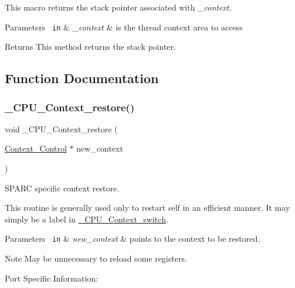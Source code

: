 This macro returns the stack pointer associated with {\itshape \+\_\+context}.


\begin{DoxyParams}[1]{Parameters}
\mbox{\texttt{ in}}  & {\em \+\_\+context} & is the thread context area to access\\
\hline
\end{DoxyParams}
\begin{DoxyReturn}{Returns}
This method returns the stack pointer. 
\end{DoxyReturn}


\subsection{Function Documentation}
\mbox{\label{group__RTEMSScoreCPUV850CPUContext_ga80726ebfe00f31a88b086cc4474c472f}} 
\subsubsection{\texorpdfstring{\_CPU\_Context\_restore()}{\_CPU\_Context\_restore()}}
{\footnotesize\ttfamily void \+\_\+\+C\+P\+U\+\_\+\+Context\+\_\+restore (\begin{DoxyParamCaption}\item[{\mbox{\hyperlink{structContext__Control}{Context\+\_\+\+Control}} $\ast$}]{new\+\_\+context }\end{DoxyParamCaption})}



S\+P\+A\+RC specific context restore. 

This routine is generally used only to restart self in an efficient manner. It may simply be a label in \mbox{\hyperlink{group__RTEMSScoreCPUARM_gaa9f8cc989454b28232e5375e30c90970}{\+\_\+\+C\+P\+U\+\_\+\+Context\+\_\+switch}}.


\begin{DoxyParams}[1]{Parameters}
\mbox{\texttt{ in}}  & {\em new\+\_\+context} & points to the context to be restored.\\
\hline
\end{DoxyParams}
\begin{DoxyNote}{Note}
May be unnecessary to reload some registers.
\end{DoxyNote}
Port Specific Information\+:

